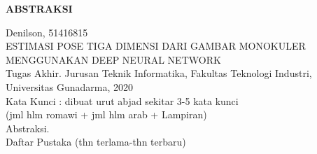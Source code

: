 \newpage %
\begin{center}
    \begin{large}\textbf{ABSTRAKSI}\end{large}
\end{center}

\vspace{5mm}

\noindent Denilson, 51416815 \\
ESTIMASI POSE TIGA DIMENSI DARI GAMBAR MONOKULER MENGGUNAKAN DEEP NEURAL NETWORK\\
Tugas Akhir. Jurusan Teknik Informatika, Fakultas Teknologi Industri, \\
Universitas Gunadarma, 2020\\
Kata Kunci : dibuat urut abjad sekitar 3-5 kata kunci\\
\noindent (jml hlm romawi + jml hlm arab + Lampiran)\\

Abstraksi.\\

\noindent Daftar Pustaka (thn terlama-thn terbaru)
